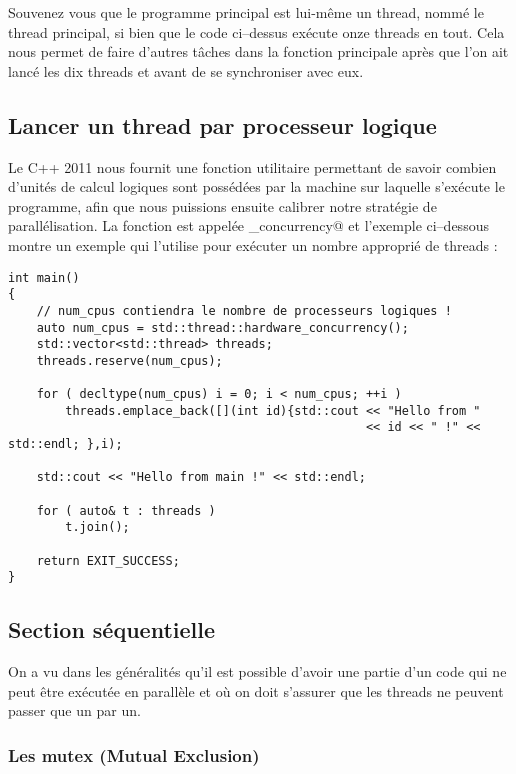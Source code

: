 \documentclass[fleqn,11pt]{article}
\begin{document}
Souvenez vous que le programme principal est lui-même un thread, nommé le thread principal, si bien que le code
ci--dessus exécute onze threads en tout. Cela nous permet de faire d'autres tâches dans la fonction principale
après que l'on ait lancé les dix threads et avant de se synchroniser avec eux. 


\subsection{Lancer un thread par processeur logique}

Le C++ 2011 nous fournit une fonction utilitaire permettant de savoir combien d'unités de calcul
logiques sont possédées par la machine sur laquelle s'exécute le programme, afin que nous puissions ensuite
calibrer notre stratégie de parallélisation. La fonction est appelée \lstinline@hardware_concurrency@
et l'exemple ci--dessous montre un exemple qui l'utilise pour exécuter un nombre approprié de threads :

\begin{lstlisting}
int main()
{
    // num_cpus contiendra le nombre de processeurs logiques !
    auto num_cpus = std::thread::hardware_concurrency();
    std::vector<std::thread> threads;
    threads.reserve(num_cpus);

    for ( decltype(num_cpus) i = 0; i < num_cpus; ++i )
        threads.emplace_back([](int id){std::cout << "Hello from " 
                                                  << id << " !" << std::endl; },i);

    std::cout << "Hello from main !" << std::endl;

    for ( auto& t : threads )
        t.join();

    return EXIT_SUCCESS;
}
\end{lstlisting}

\subsection{Section séquentielle}

On a vu dans les généralités qu'il est possible d'avoir une partie d'un code qui ne peut être exécutée en parallèle et où on doit s'assurer que les threads ne peuvent passer que un par un.

\subsubsection{Les mutex (Mutual Exclusion)}
\end{document}
